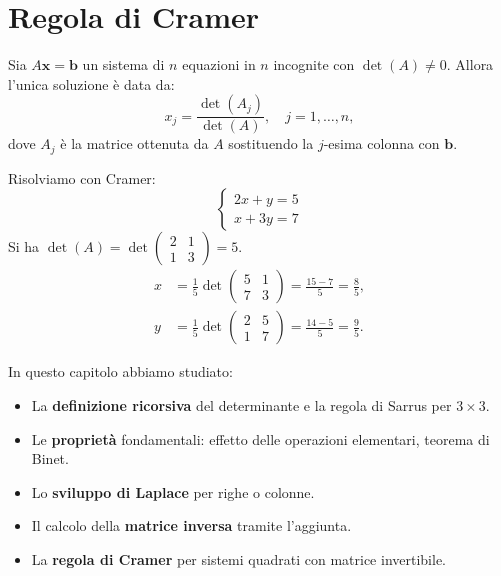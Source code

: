 \section{Regola di Cramer}
\label{sec:cramer}

\begin{theorembox}
\label{thm:cramer}
Sia $A\mathbf{x} = \mathbf{b}$ un sistema di $n$ equazioni in $n$ incognite con $\det(A) \neq 0$. Allora l'unica soluzione è data da:
\[ x_j = \frac{\det(A_j)}{\det(A)}, \quad j = 1, \ldots, n, \]
dove $A_j$ è la matrice ottenuta da $A$ sostituendo la $j$-esima colonna con $\mathbf{b}$.
\end{theorembox}

\begin{examplebox}
Risolviamo con Cramer:
\[ \begin{cases} 2x + y = 5 \\ x + 3y = 7 \end{cases} \]
Si ha $\det(A) = \det\begin{pmatrix} 2 & 1 \\ 1 & 3 \end{pmatrix} = 5$.
\begin{align*}
    x &= \frac{1}{5}\det\begin{pmatrix} 5 & 1 \\ 7 & 3 \end{pmatrix} = \frac{15 - 7}{5} = \frac{8}{5}, \\
    y &= \frac{1}{5}\det\begin{pmatrix} 2 & 5 \\ 1 & 7 \end{pmatrix} = \frac{14 - 5}{5} = \frac{9}{5}.
\end{align*}
\end{examplebox}

\begin{notebox}
In questo capitolo abbiamo studiato:
\begin{itemize}
    \item La \textbf{definizione ricorsiva} del determinante e la regola di Sarrus per $3 \times 3$.
    \item Le \textbf{proprietà} fondamentali: effetto delle operazioni elementari, teorema di Binet.
    \item Lo \textbf{sviluppo di Laplace} per righe o colonne.
    \item Il calcolo della \textbf{matrice inversa} tramite l'aggiunta.
    \item La \textbf{regola di Cramer} per sistemi quadrati con matrice invertibile.
\end{itemize}
\end{notebox}
